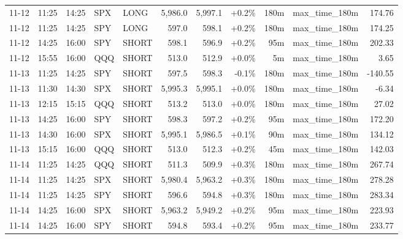 \documentclass[11pt,a4paper,twoside]{article}
\begin{document}
\begin{center}
\begin{longtable}{>{\color{txtmain}}l l l l l r r r r >{\color{txtmain}}l r}
11-12 & 11:25 & 14:25 & SPX & LONG & 5,986.0 & 5,997.1 & \textcolor{wingreen}{+0.2\%} & 180m & max\_time\_180m & \textcolor{wingreen}{174.76} \\
11-12 & 11:25 & 14:25 & SPY & LONG & 597.0 & 598.1 & \textcolor{wingreen}{+0.2\%} & 180m & max\_time\_180m & \textcolor{wingreen}{174.25} \\
11-12 & 14:25 & 16:00 & SPY & SHORT & 598.1 & 596.9 & \textcolor{wingreen}{+0.2\%} & 95m & max\_time\_180m & \textcolor{wingreen}{202.33} \\
11-12 & 15:55 & 16:00 & QQQ & SHORT & 513.0 & 512.9 & \textcolor{wingreen}{+0.0\%} & 5m & max\_time\_180m & \textcolor{wingreen}{3.65} \\
11-13 & 11:25 & 14:25 & SPY & SHORT & 597.5 & 598.3 & \textcolor{lossred}{-0.1\%} & 180m & max\_time\_180m & \textcolor{lossred}{-140.55} \\
11-13 & 11:30 & 14:30 & SPX & SHORT & 5,995.3 & 5,995.1 & \textcolor{wingreen}{+0.0\%} & 180m & max\_time\_180m & \textcolor{lossred}{-6.34} \\
11-13 & 12:15 & 15:15 & QQQ & SHORT & 513.2 & 513.0 & \textcolor{wingreen}{+0.0\%} & 180m & max\_time\_180m & \textcolor{wingreen}{27.02} \\
11-13 & 14:25 & 16:00 & SPY & SHORT & 598.3 & 597.2 & \textcolor{wingreen}{+0.2\%} & 95m & max\_time\_180m & \textcolor{wingreen}{172.20} \\
11-13 & 14:30 & 16:00 & SPX & SHORT & 5,995.1 & 5,986.5 & \textcolor{wingreen}{+0.1\%} & 90m & max\_time\_180m & \textcolor{wingreen}{134.12} \\
11-13 & 15:15 & 16:00 & QQQ & SHORT & 513.0 & 512.3 & \textcolor{wingreen}{+0.2\%} & 45m & max\_time\_180m & \textcolor{wingreen}{142.03} \\
11-14 & 11:25 & 14:25 & QQQ & SHORT & 511.3 & 509.9 & \textcolor{wingreen}{+0.3\%} & 180m & max\_time\_180m & \textcolor{wingreen}{267.74} \\
11-14 & 11:25 & 14:25 & SPX & SHORT & 5,980.4 & 5,963.2 & \textcolor{wingreen}{+0.3\%} & 180m & max\_time\_180m & \textcolor{wingreen}{278.28} \\
11-14 & 11:25 & 14:25 & SPY & SHORT & 596.6 & 594.8 & \textcolor{wingreen}{+0.3\%} & 180m & max\_time\_180m & \textcolor{wingreen}{283.34} \\
11-14 & 14:25 & 16:00 & SPX & SHORT & 5,963.2 & 5,949.2 & \textcolor{wingreen}{+0.2\%} & 95m & max\_time\_180m & \textcolor{wingreen}{223.93} \\
11-14 & 14:25 & 16:00 & SPY & SHORT & 594.8 & 593.4 & \textcolor{wingreen}{+0.2\%} & 95m & max\_time\_180m & \textcolor{wingreen}{233.77} \\

\end{longtable}
\end{center}
\end{document}
